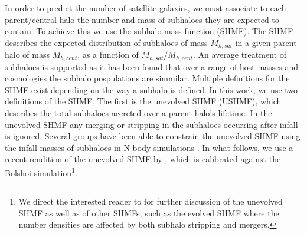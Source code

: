 In order to predict the number of satellite galaxies, we must associate to each parent/central halo the number and mass of subhaloes they are expected to contain. To achieve this we use the subhalo mass function (SHMF). The SHMF describes the expected distribution of subhaloes of mass $M_{h,sat}$ in a given parent halo of mass $M_{h,cent}$, as a function of $M_{h,sat}/M_{h,cent}$. An average treatment of subhaloes is supported as it has been found that over a range of host masses \cite{Gill2004TheEnvironment} and cosmologies \cite{Jiang2016StatisticsFunctions} the subhalo pospulations are simmilar. Multiple definitions for the SHMF exist depending on the way a subhalo is defined. In this work, we use two definitions of the SHMF. The first is the unevolved SHMF (USHMF), which describes the total subhaloes accreted over a parent halo's lifetime. In the unevolved SHMF any merging or stripping in the subhaloes occurring after infall is ignored. Several groups have been able to constrain the unevolved SHMF using the infall masses of subhaloes in N-body simulations \citep{Jiang2016StatisticsFunctions}. In what follows, we use a recent rendition of the unevolved SHMF by \citet{Jiang2016StatisticsFunctions}, which is calibrated against the Bolshoi simulation\footnote{We direct the interested reader to \citet{Jiang2016StatisticsFunctions} for further discussion of the unevolved SHMF as well as of other SHMFs, such as the evolved SHMF where the number densities are affected by both subhalo stripping and mergers.}.

